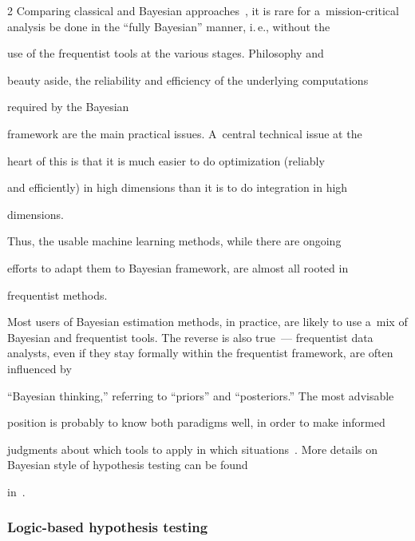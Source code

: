 \begin{multicols}{2}
  Comparing classical and Bayesian approaches~\cite{27-kl}, it is rare for a~mission-critical analysis be done in the ``fully Bayesian'' manner, i.\,e., without the


use of the frequentist tools at the various stages. Philosophy and


beauty aside, the reliability and efficiency of the underlying computations


required by the Bayesian


framework are the main practical issues. A~central technical issue at the


heart of this is that it is much easier to do optimization (reliably


and efficiently) in high dimensions than it is to do integration in high


dimensions.


Thus, the usable machine learning methods, while there are ongoing


efforts to adapt them to Bayesian framework, are almost all rooted in


frequentist methods.





  Most users of Bayesian estimation methods, in practice, are likely to use a~mix of Bayesian and frequentist tools. The reverse is also true~--- frequentist data analysts, even if they stay formally within the frequentist framework, are often influenced by


``Bayesian thinking,'' referring to ``priors'' and ``posteriors.'' The most advisable


position is probably to know both paradigms well, in order to make informed


judgments about which tools to apply in which situations~\cite{27-kl}.  More details on Bayesian style of hypothesis testing can be found


in~\cite{27-kl,  28-kl, 33-kl}.





\vspace*{-8pt}





\subsubsection{Logic-based hypothesis testing}






\end{multicols}
